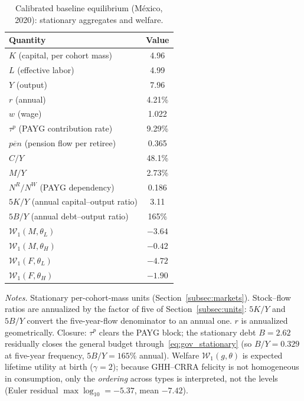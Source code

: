 \documentclass[12pt,a4paper]{article}
\begin{document}
\begin{table}[H]
\centering
\caption{Calibrated baseline equilibrium (M\'exico, 2020): stationary aggregates and welfare.}
\label{tab:calibrated_baseline}
\begin{tabular}{lc}
\toprule
Quantity & Value \\
\midrule
$K$ (capital, per cohort mass)              & 4.96 \\
$L$ (effective labor)                       & 4.99 \\
$Y$ (output)                                & 7.96 \\
$r$ (annual)                                & 4.21\% \\
$w$ (wage)                                  & 1.022 \\
$\tau^p$ (PAYG contribution rate)           & 9.29\% \\
$\overline{pen}$ (pension flow per retiree) & 0.365 \\
$C/Y$                                       & 48.1\% \\
$M/Y$                                       & 2.73\% \\
$N^R/N^W$ (PAYG dependency)                 & 0.186 \\
$5K/Y$ (annual capital--output ratio)       & 3.11 \\
$5B/Y$ (annual debt--output ratio)          & 165\% \\
\midrule
$\mathcal{W}_1(M,\theta_L)$                 & $-3.64$ \\
$\mathcal{W}_1(M,\theta_H)$                 & $-0.42$ \\
$\mathcal{W}_1(F,\theta_L)$                 & $-4.72$ \\
$\mathcal{W}_1(F,\theta_H)$                 & $-1.90$ \\
\bottomrule
\end{tabular}

\vspace{0.5em}
\begin{minipage}{0.92\textwidth}
\footnotesize \textit{Notes.} Stationary per-cohort-mass units (Section~\ref{subsec:markets}). Stock--flow ratios are annualized by the factor of five of Section~\ref{subsec:units}: $5K/Y$ and $5B/Y$ convert the five-year-flow denominator to an annual one. $r$ is annualized geometrically. Closure: $\tau^p$ clears the PAYG block; the stationary debt $B=2.62$ residually closes the general budget through~\eqref{eq:gov_stationary} (so $B/Y=0.329$ at five-year frequency, $5B/Y=165\%$ annual). Welfare $\mathcal{W}_1(g,\theta)$ is expected lifetime utility at birth ($\gamma=2$); because GHH--CRRA felicity is not homogeneous in consumption, only the \emph{ordering} across types is interpreted, not the levels (Euler residual $\max\log_{10}=-5.37$, mean $-7.42$).
\end{minipage}
\end{table}
\end{document}
